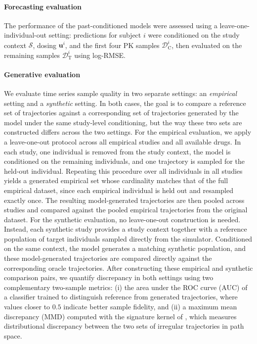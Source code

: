 \paragraph{Forecasting evaluation} The performance of the past-conditioned models were assessed using a leave-one-individual-out setting: predictions for subject $i$ were conditioned on the study context $\mathcal{S}$, dosing $\mathbf{u}^i$, and the first four PK samples $\mathcal{D}^i_{\text{C}}$, then evaluated on the remaining samples $\mathcal{D}^i_{\text{T}}$ using log-RMSE.\\ 


\paragraph{Generative evaluation} We evaluate time series sample quality in two separate settings: an \emph{empirical} setting and a \emph{synthetic} setting. 
%
In both cases, the goal is to compare a reference set of trajectories against a corresponding set of trajectories generated by the model under the same study-level conditioning, but the way these two sets are constructed differs across the two settings.
%
For the empirical evaluation, we apply a leave-one-out protocol across all empirical studies and all available drugs. 
%
In each study, one individual is removed from the study context, the model is conditioned on the remaining individuals, and one trajectory is sampled for the held-out individual. 
%
Repeating this procedure over all individuals in all studies yields a generated empirical set whose cardinality matches that of the full empirical dataset, since each empirical individual is held out and resampled exactly once. 
%
The resulting model-generated trajectories are then pooled across studies and compared against the pooled empirical trajectories from the original dataset.
%
For the synthetic evaluation, no leave-one-out construction is needed. 
%
Instead, each synthetic study provides a study context together with a reference population of target individuals sampled directly from the simulator. 
%
Conditioned on the same context, the model generates a matching synthetic population, and these model-generated trajectories are compared directly against the corresponding oracle trajectories.
%
After constructing these empirical and synthetic comparison pairs, we quantify discrepancy in both settings using two complementary two-sample metrics: 
%
(i) the area under the ROC curve (AUC) of a classifier trained to distinguish reference from generated trajectories, where values closer to $0.5$ indicate better sample fidelity, and 
%
(ii) a maximum mean discrepancy (MMD) computed with the signature kernel of \citet{kiraly2019kernels}, which measures distributional discrepancy between the two sets of irregular trajectories in path space.


